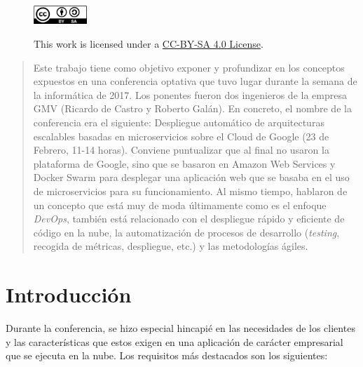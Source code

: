 \begin{titlepage}

\vfill %



\captionsetup[figure]{labelformat=empty,justification=raggedright,singlelinecheck=false}
\begin{figure}[h]

        \includegraphics[width=2cm,keepaspectratio]{cc-by-sa.png}
        \label{fig:by-sa}
        \caption{ This work is licensed under a \href{https://creativecommons.org/licenses/by/4.0/legalcode}{CC-BY-SA 4.0 License}.}

\end{figure}

\end{titlepage}

\tableofcontents
\clearpage

\begin{abstract}
Este trabajo tiene como objetivo exponer y profundizar en los conceptos expuestos en una conferencia optativa que tuvo lugar durante la semana de la informática de 2017. Los ponentes fueron dos ingenieros de la empresa GMV (Ricardo de Castro y Roberto Galán). En concreto, el nombre de la conferencia era el siguiente: Despliegue automático de arquitecturas escalables basadas en microservicios sobre el Cloud de Google (23 de Febrero, 11-14 horas). Conviene puntualizar que al final no usaron la plataforma de Google, sino que se basaron en Amazon Web Services y Docker Swarm para desplegar una aplicación web que se basaba en el uso de microservicios para su funcionamiento. Al mismo tiempo, hablaron de un concepto que está muy de moda últimamente como es el enfoque \emph{DevOps}, también está relacionado con el despliegue rápido y eficiente de código en la nube, la automatización de procesos de desarrollo (\emph{testing}, recogida de métricas, despliegue, etc.) y las metodologías ágiles.
\end{abstract}

\section{Introducción}

Durante la conferencia, se hizo especial hincapié en las necesidades de los clientes y las características que estos exigen en una aplicación de carácter empresarial que se ejecuta en la nube. Los requisitos más destacados son los siguientes:

